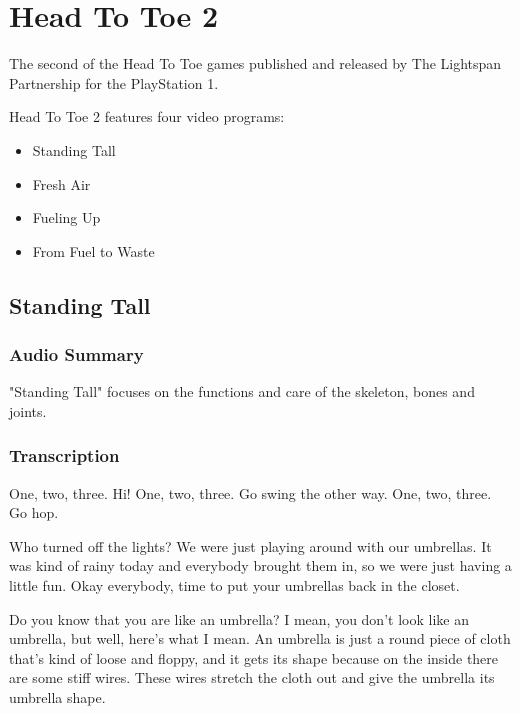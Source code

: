 \chapter{Head To Toe 2}


The second of the Head To Toe games published and released by The Lightspan Partnership for the PlayStation 1.

Head To Toe 2 features four video programs:

\begin{itemize}
    \item Standing Tall
    \item Fresh Air
    \item Fueling Up
    \item From Fuel to Waste
\end{itemize}

\clearpage
\newpage

\section{Standing Tall}

\subsection{Audio Summary}

"Standing Tall" focuses on the functions and care of the skeleton, bones and joints.

\subsection{Transcription}

One, two, three. Hi! One, two, three. Go swing the other way. One, two, three. Go hop.

Who turned off the lights? We were just playing around with our umbrellas. It was kind of rainy today and everybody brought them in, so we were just having a little fun. Okay everybody, time to put your umbrellas back in the closet.

Do you know that you are like an umbrella? I mean, you don't look like an umbrella, but well, here's what I mean. An umbrella is just a round piece of cloth that's kind of loose and floppy, and it gets its shape because on the inside there are some stiff wires. These wires stretch the cloth out and give the umbrella its umbrella shape.

